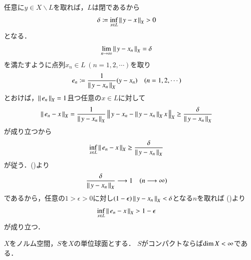 	\begin{prf}
		任意に$y \in X \backslash L$を取れば，$L$は閉であるから
		\begin{align}
			\delta \coloneqq \operatorname*{inf}_{x \in L} \left\|\, y - x\, \right\|_{X} > 0 
		\end{align}
		となる．
		\begin{align}
			\lim_{n \to \infty} \left\|\, y - x_n\, \right\|_{X} = \delta 
			\label{eq:thm_closed_subspace_distance}
		\end{align}
		を満たすように点列$x_n \in L\ (n=1,2,\cdots)$を取り
		\begin{align}
			e_n \coloneqq \frac{1}{\left\|\, y - x_n\, \right\|_{X}} (y - x_n) \quad (n=1,2,\cdots)
		\end{align}
		とおけば，$\left\|\, e_n\, \right\|_{X} = 1$且つ任意の$x \in L$に対して
		\begin{align}
			\left\|\, e_n - x\, \right\|_{X} = \frac{1}{\left\|\, y - x_n\, \right\|_{X}} \left\|\, y - x_n - \left\|\, y - x_n\, \right\|_{X} x\, \right\|_{X} \geq \frac{\delta}{\left\|\, y - x_n\, \right\|_{X}}
		\end{align}
		が成り立つから
		\begin{align}
			\operatorname*{inf}_{x \in L} \left\|\, e_n - x\, \right\|_{X} \geq \frac{\delta}{\left\|\, y - x_n\, \right\|_{X}}
			\label{eq:thm_closed_subspace_distance_2}
		\end{align}
		が従う．()より
		\begin{align}
			\frac{\delta}{\left\|\, y - x_n\, \right\|_{X}} \longrightarrow 1 \quad (n \longrightarrow \infty)
		\end{align}
		であるから，任意の$1 > \epsilon > 0$に対し$(1 - \epsilon) \left\|\, y - x_n\, \right\|_{X} < \delta$となる$n$を取れば
		()より
		\begin{align}
			\operatorname*{inf}_{x \in L} \left\|\, e_n - x\, \right\|_{X} > 1 - \epsilon
		\end{align}
		が成り立つ．
		\QED
	\end{prf}
	
	\begin{screen}
		\begin{thm}[単位球面がコンパクトなら有限次元]
			$X$をノルム空間，$S$を$X$の単位球面とする．
			$S$がコンパクトならば$\operatorname{dim} X < \infty$である．
			\label{thm:normed_space_unit_sphere_compact_finite_dimension}
		\end{thm}
	\end{screen}
	
